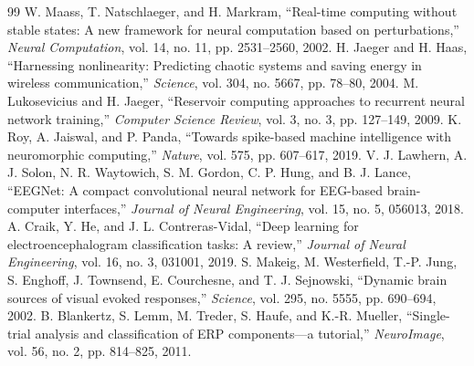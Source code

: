 \balance
\begin{thebibliography}{99}
 W. Maass, T. Natschlaeger, and H. Markram, ``Real-time computing without stable states: A new framework for neural computation based on perturbations,'' \emph{Neural Computation}, vol. 14, no. 11, pp. 2531--2560, 2002.
 H. Jaeger and H. Haas, ``Harnessing nonlinearity: Predicting chaotic systems and saving energy in wireless communication,'' \emph{Science}, vol. 304, no. 5667, pp. 78--80, 2004.
 M. Lukosevicius and H. Jaeger, ``Reservoir computing approaches to recurrent neural network training,'' \emph{Computer Science Review}, vol. 3, no. 3, pp. 127--149, 2009.
 K. Roy, A. Jaiswal, and P. Panda, ``Towards spike-based machine intelligence with neuromorphic computing,'' \emph{Nature}, vol. 575, pp. 607--617, 2019.
 V. J. Lawhern, A. J. Solon, N. R. Waytowich, S. M. Gordon, C. P. Hung, and B. J. Lance, ``EEGNet: A compact convolutional neural network for EEG-based brain-computer interfaces,'' \emph{Journal of Neural Engineering}, vol. 15, no. 5, 056013, 2018.
 A. Craik, Y. He, and J. L. Contreras-Vidal, ``Deep learning for electroencephalogram classification tasks: A review,'' \emph{Journal of Neural Engineering}, vol. 16, no. 3, 031001, 2019.
 S. Makeig, M. Westerfield, T.-P. Jung, S. Enghoff, J. Townsend, E. Courchesne, and T. J. Sejnowski, ``Dynamic brain sources of visual evoked responses,'' \emph{Science}, vol. 295, no. 5555, pp. 690--694, 2002.
 B. Blankertz, S. Lemm, M. Treder, S. Haufe, and K.-R. Mueller, ``Single-trial analysis and classification of ERP components---a tutorial,'' \emph{NeuroImage}, vol. 56, no. 2, pp. 814--825, 2011.
\end{thebibliography}
